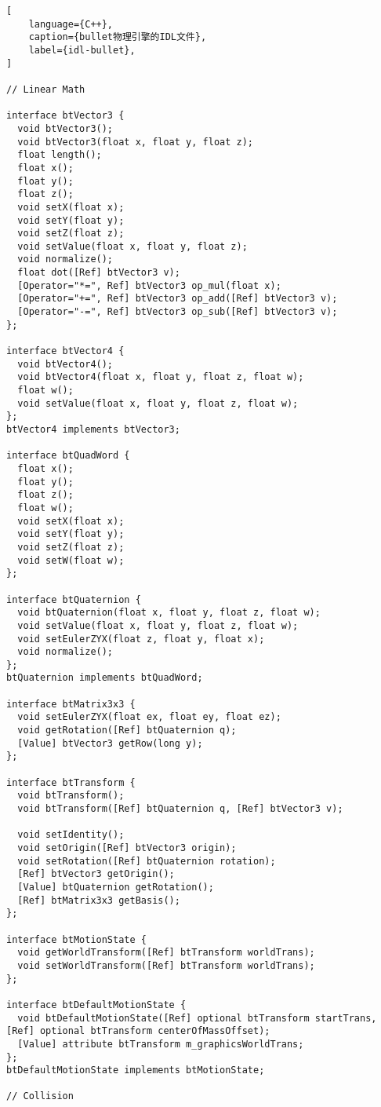 \begin{lstlisting}[
    language={C++},
    caption={bullet物理引擎的IDL文件},
    label={idl-bullet},
]

// Linear Math

interface btVector3 {
  void btVector3();
  void btVector3(float x, float y, float z);
  float length();
  float x();
  float y();
  float z();
  void setX(float x);
  void setY(float y);
  void setZ(float z);
  void setValue(float x, float y, float z);
  void normalize();
  float dot([Ref] btVector3 v);
  [Operator="*=", Ref] btVector3 op_mul(float x);
  [Operator="+=", Ref] btVector3 op_add([Ref] btVector3 v);
  [Operator="-=", Ref] btVector3 op_sub([Ref] btVector3 v);
};

interface btVector4 {
  void btVector4();
  void btVector4(float x, float y, float z, float w);
  float w();
  void setValue(float x, float y, float z, float w);
};
btVector4 implements btVector3;

interface btQuadWord {
  float x();
  float y();
  float z();
  float w();
  void setX(float x);
  void setY(float y);
  void setZ(float z);
  void setW(float w);
};

interface btQuaternion {
  void btQuaternion(float x, float y, float z, float w);
  void setValue(float x, float y, float z, float w);
  void setEulerZYX(float z, float y, float x);
  void normalize();
};
btQuaternion implements btQuadWord;

interface btMatrix3x3 {
  void setEulerZYX(float ex, float ey, float ez);
  void getRotation([Ref] btQuaternion q);
  [Value] btVector3 getRow(long y);
};

interface btTransform {
  void btTransform();
  void btTransform([Ref] btQuaternion q, [Ref] btVector3 v);

  void setIdentity();
  void setOrigin([Ref] btVector3 origin);
  void setRotation([Ref] btQuaternion rotation);
  [Ref] btVector3 getOrigin();
  [Value] btQuaternion getRotation();
  [Ref] btMatrix3x3 getBasis();
};

interface btMotionState {
  void getWorldTransform([Ref] btTransform worldTrans);
  void setWorldTransform([Ref] btTransform worldTrans);
};

interface btDefaultMotionState {
  void btDefaultMotionState([Ref] optional btTransform startTrans, [Ref] optional btTransform centerOfMassOffset);
  [Value] attribute btTransform m_graphicsWorldTrans;
};
btDefaultMotionState implements btMotionState;

// Collision


\end{lstlisting}
